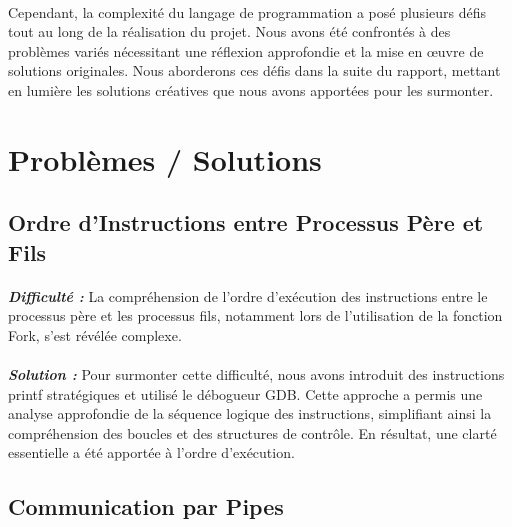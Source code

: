 \documentclass{article}
\begin{document}
\paragraph{}Cependant, la complexité du langage de programmation a posé plusieurs défis tout au long de la réalisation du projet. Nous avons été confrontés à des problèmes variés nécessitant une réflexion approfondie et la mise en œuvre de solutions originales. Nous aborderons ces défis dans la suite du rapport, mettant en lumière les solutions créatives que nous avons apportées pour les surmonter. 

\newpage


\section{Problèmes / Solutions}
\hspace{1cm}

\subsection{Ordre d'Instructions entre Processus Père et Fils}
\paragraph{}\textit{\textbf{Difficulté :}} La compréhension de l'ordre d'exécution des instructions entre le processus père et les processus fils, notamment lors de l'utilisation de la fonction Fork, s'est révélée complexe. 
\paragraph{}\textit{\textbf{Solution :}} Pour surmonter cette difficulté, nous avons introduit des instructions printf stratégiques et utilisé le débogueur GDB. Cette approche a permis une analyse approfondie de la séquence logique des instructions, simplifiant ainsi la compréhension des boucles et des structures de contrôle. En résultat, une clarté essentielle a été apportée à l'ordre d'exécution. 

\paragraph{}
\subsection{Communication par Pipes}
\end{document}
